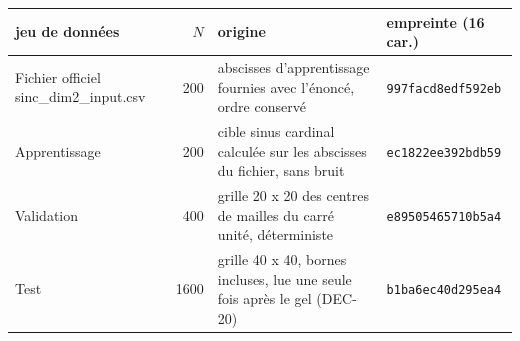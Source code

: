 \begin{tabular}{l r l l}
\toprule
{jeu de donn\'ees} & {\(N\)} & {origine} & {empreinte (16 car.)} \\
\midrule
Fichier officiel sinc\_dim2\_input.csv & 200 & abscisses d'apprentissage fournies avec l'\'enonc\'e, ordre conserv\'e & \texttt{997facd8edf592eb} \\
Apprentissage & 200 & cible sinus cardinal calcul\'ee sur les abscisses du fichier, sans bruit & \texttt{ec1822ee392bdb59} \\
Validation & 400 & grille 20 x 20 des centres de mailles du carr\'e unit\'e, d\'eterministe & \texttt{e89505465710b5a4} \\
Test & 1600 & grille 40 x 40, bornes incluses, lue une seule fois apr\`es le gel (DEC-20) & \texttt{b1ba6ec40d295ea4} \\
\bottomrule
\end{tabular}
